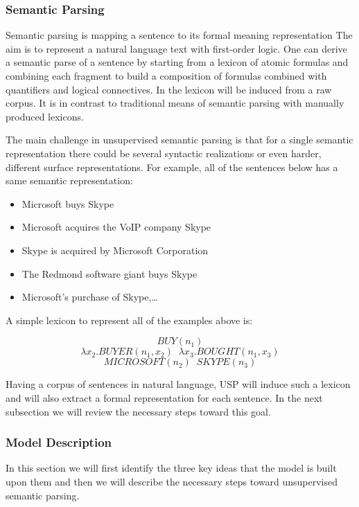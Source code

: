 \subsubsection{Semantic Parsing}
\label{ssec:usp-sem-parse}

Semantic parsing is mapping a sentence to its formal meaning representation \cite{Poon2009}
The aim is to represent a natural language text with first-order logic. One can derive a semantic parse of a sentence
by starting from a lexicon of atomic formulas and combining each fragment to build a composition of 
formulas combined with quantifiers and logical connectives. In \cite{Poon2009} 
the lexicon will be induced from a raw corpus. It is in contrast to traditional means of semantic parsing with manually
  produced lexicons.
  
  The main challenge in unsupervised semantic parsing is that for a single semantic representation there could be
  several syntactic realizations or even harder, different surface representations. For example, all of the
   sentences below has a same semantic representation:
   \begin{itemize}
     \item Microsoft buys Skype
     \item Microsoft acquires the VoIP company Skype
     \item Skype is acquired by Microsoft Corporation
     \item The Redmond software giant buys Skype
     \item Microsoft’s purchase of Skype,\ldots
   \end{itemize}  
  
   A simple lexicon to represent all of the examples above is:
  
   $$ BUY(n_1)$$
   $$ \lambda x_2.BUYER(n_1 , x_2) \; \;  \lambda x_3.BOUGHT(n_1 , x_3) $$
   $$ MICROSOFT(n_2) \; \; SKYPE(n_3)$$
   
   Having a corpus of sentences in natural language, USP \cite{Poon2009}
    will induce such a lexicon and will also extract a formal representation for each sentence. In the next 
    subsection we will review the necessary steps toward this goal.
\subsubsection{Model Description}
\label{ssec:usp-model-dscrb}
In this section we will first identify the three key ideas that the model is built upon them and then 
we will describe the necessary steps toward unsupervised semantic parsing.

